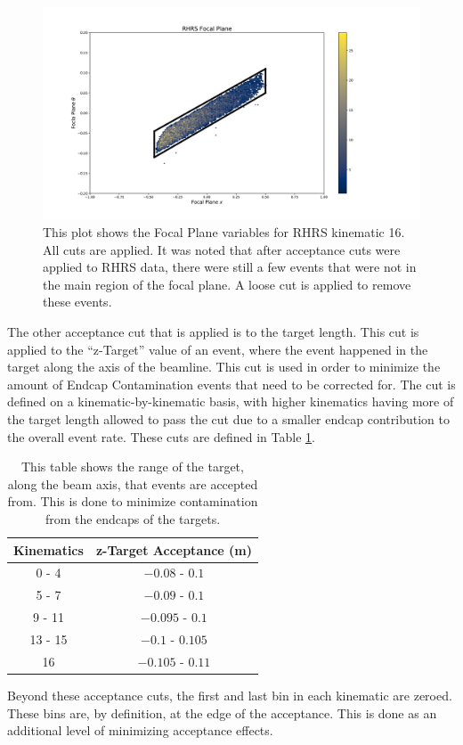 \begin{figure}
\begin{center}
	\includegraphics[width=\textwidth]{./analysis/fig/RHRS_fp.pdf}
	\caption{This plot shows the Focal Plane variables for RHRS kinematic 16. All cuts are applied. It was noted that after acceptance cuts were applied to RHRS data, there were still a few events that were not in the main region of the focal plane. A loose cut is applied to remove these events.}
	\label{fig:rfp}
\end{center}
\end{figure}

The other acceptance cut that is applied is to the target length. This cut is applied to the ``z-Target'' value of an event, where the event happened in the target along the axis of the beamline. This cut is used in order to minimize the amount of Endcap Contamination events that need to be corrected for. The cut is defined on a kinematic-by-kinematic basis, with higher kinematics having more of the target length allowed to pass the cut due to a smaller endcap contribution to the overall event rate. These cuts are defined in Table \ref{tbl:ztar}.

\begin{table}
\begin{center}
\begin{tabular}{|c|c|}
\hline
\textbf{Kinematics} & \textbf{z-Target Acceptance (m)}\\
\hline\hline
0 - 4 & $-0.08$ - $0.1$ \\ \hline
5 - 7 & $-0.09$ - $0.1$ \\ \hline
9 - 11 & $-0.095$ - $0.1$ \\ \hline
13 - 15 & $-0.1$ - $0.105$ \\ \hline
16 & $-0.105$ - $0.11$ \\ \hline
\end{tabular}
\caption{This table shows the range of the target, along the beam axis, that events are accepted from. This is done to minimize contamination from the endcaps of the targets.}
\label{tbl:ztar}
\end{center}
\end{table}

Beyond these acceptance cuts, the first and last bin in each kinematic are zeroed. These bins are, by definition, at the edge of the acceptance. This is done as an additional level of minimizing acceptance effects.